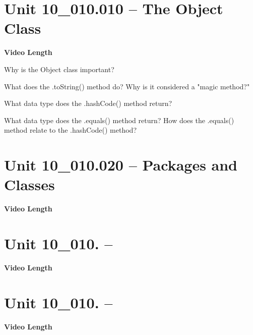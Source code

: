 \documentclass[letterpaper,12pt]{exam}
\newcommand{\unit}{Unit 10}
\begin{document}
\section*{\unit\_010.010 -- The Object Class} 
\par{\selectfont\textbf{Video Length }}
\begin{questions}
\begin{samepage}
    \question Why is the Object class important?
    \vspace{5mm}
\end{samepage}
\begin{samepage}
    \question What does the .toString() method do?  Why is it considered a "magic method?"
    \vspace{5mm}
\end{samepage}

\begin{samepage}
    \question What data type does the .hashCode() method return?
    \vspace{5mm}
\end{samepage}

\begin{samepage}
    \question What data type does the .equals() method return?  How does the .equals() method relate to the .hashCode() method?
    \vspace{5mm}
\end{samepage}

\section*{\unit\_010.020 -- Packages and Classes} 
\par{\selectfont\textbf{Video Length }}


\section*{\unit\_010. -- } 
\par{\selectfont\textbf{Video Length }}

\section*{\unit\_010. -- } 
\par{\selectfont\textbf{Video Length }}


\end{questions}
\end{document}
